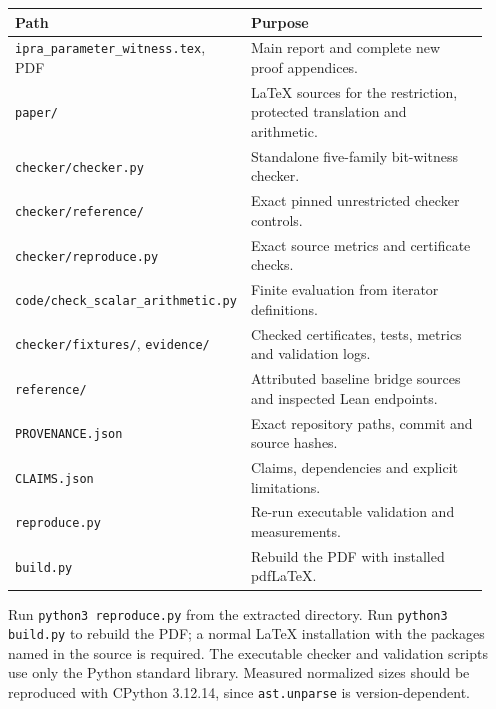 \documentclass[11pt,letterpaper]{article}
\theoremstyle{definition}
\theoremstyle{remark}
\begin{document}
\begin{longtable}{p{0.40\linewidth}p{0.54\linewidth}}
\toprule
Path & Purpose\\\midrule
\endhead
\texttt{ipra\_parameter\_witness.tex}, PDF & Main report and complete new proof appendices.\\
\texttt{paper/} & LaTeX sources for the restriction, protected translation and arithmetic.\\
\texttt{checker/checker.py} & Standalone five-family bit-witness checker.\\
\texttt{checker/reference/} & Exact pinned unrestricted checker controls.\\
\texttt{checker/reproduce.py} & Exact source metrics and certificate checks.\\
\texttt{code/check\_scalar\_arithmetic.py} & Finite evaluation from iterator definitions.\\
\texttt{checker/fixtures/}, \texttt{evidence/} & Checked certificates, tests, metrics and validation logs.\\
\texttt{reference/} & Attributed baseline bridge sources and inspected Lean endpoints.\\
\texttt{PROVENANCE.json} & Exact repository paths, commit and source hashes.\\
\texttt{CLAIMS.json} & Claims, dependencies and explicit limitations.\\
\texttt{reproduce.py} & Re-run executable validation and measurements.\\
\texttt{build.py} & Rebuild the PDF with installed pdfLaTeX.\\
\bottomrule
\end{longtable}

Run \texttt{python3 reproduce.py} from the extracted directory.
Run \texttt{python3 build.py} to rebuild the PDF; a normal LaTeX
installation with the packages named in the source is required.
The executable checker and validation scripts use only the Python
standard library. Measured normalized sizes should be reproduced with
CPython 3.12.14, since \texttt{ast.unparse} is version-dependent.
\end{document}
